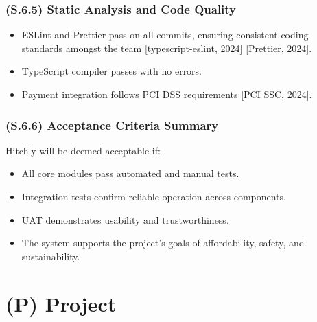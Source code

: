 \documentclass[12pt,letterpaper]{article}
\begin{document}
\subsubsection{(S.6.5) Static Analysis and Code Quality} %
\begin{itemize}
  \item ESLint and Prettier pass on all commits, ensuring consistent coding standards amongst the team [typescript-eslint, 2024] [Prettier, 2024].
    \item TypeScript compiler passes with no errors.
  \item Payment integration follows PCI DSS requirements [PCI SSC, 2024].
\end{itemize}

\subsubsection{(S.6.6) Acceptance Criteria Summary} %
Hitchly will be deemed acceptable if:

\begin{itemize}
    \item All core modules pass automated and manual tests.
    \item Integration tests confirm reliable operation across components.
    \item UAT demonstrates usability and trustworthiness.
    \item The system supports the project’s goals of affordability, safety, and sustainability.
\end{itemize}

\newpage

\section{(P) Project}
\end{document}

